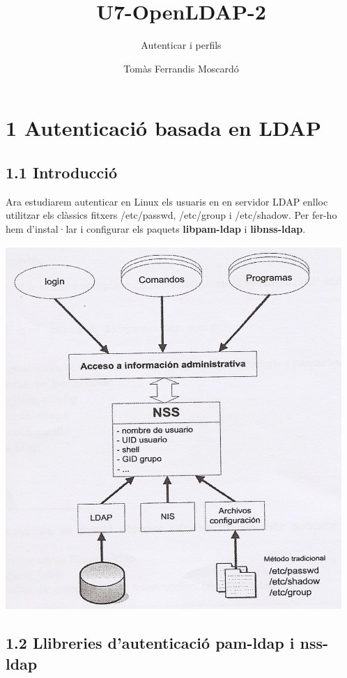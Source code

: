 \documentclass[
  12 pt,
  a4paper,
]{article}
\title{U7-OpenLDAP-2}
\subtitle{Autenticar i perfils}
\author{Tomàs Ferrandis Moscardó}
\date{}
\begin{document}
\maketitle

{
\setcounter{tocdepth}{2}
\tableofcontents
}
\section{1 Autenticació basada en
LDAP}\label{autenticaciuxf3-basada-en-ldap}

\subsection{1.1 Introducció}\label{introducciuxf3}

Ara estudiarem autenticar en Linux els usuaris en en servidor LDAP
enlloc utilitzar els clàssics fitxers /etc/passwd, /etc/group i
/etc/shadow. Per fer-ho hem d'instal·lar i configurar els paquets
\textbf{libpam-ldap} i \textbf{libnss-ldap}.

\includegraphics{png/nss.png}

\subsection{1.2 Llibreries d'autenticació pam-ldap i
nss-ldap}\label{llibreries-dautenticaciuxf3-pam-ldap-i-nss-ldap}
\end{document}
